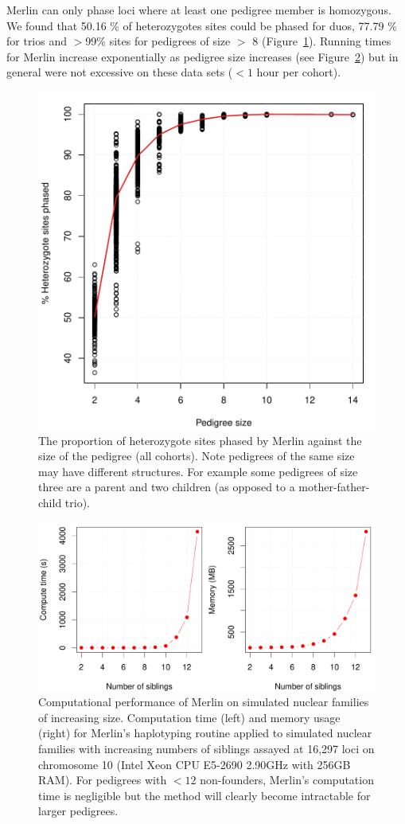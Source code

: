 Merlin can only phase loci where at least one pedigree member is homozygous. We found that 50.16 \% of heterozygotes sites could be phased for duos, 77.79 \% for trios and $>$99\% sites for pedigrees of size $>$ 8 (Figure~\ref{fig:merlin_yield}).  Running times for Merlin increase exponentially as pedigree size increases (see Figure~\ref{fig:merlin_compute}) but in general were not excessive on these data sets ($<1$ hour per cohort). 

\begin{figure}
\centering
   \includegraphics[width=.5\textwidth]{chap4figs/merlin_callrate}%
\caption[Proportion of sites phased by Merlin]{The proportion of heterozygote sites phased by Merlin against the size of the pedigree (all cohorts).  Note pedigrees of the same size may have different structures.  For example some pedigrees of size three are a parent and two children (as opposed to a mother-father-child trio).\label{fig:merlin_yield}}
\end{figure}


\begin{figure}[p]
\begin{center} 
\includegraphics[width=\textwidth]{chap4figs/merlin-compute}%
\end{center} 
\caption[Computational performance of Merlin]{Computational performance of Merlin on simulated nuclear families of increasing size.  Computation time (left) and memory usage (right) for Merlin's haplotyping routine applied to simulated nuclear families with increasing numbers of siblings assayed at 16,297 loci on chromosome 10 (Intel Xeon CPU E5-2690 2.90GHz with 256GB RAM). For pedigrees with $<12$ non-founders, Merlin's computation time is negligible  but the method will clearly become intractable for larger pedigrees.\label{fig:merlin_compute}}
\end{figure}

